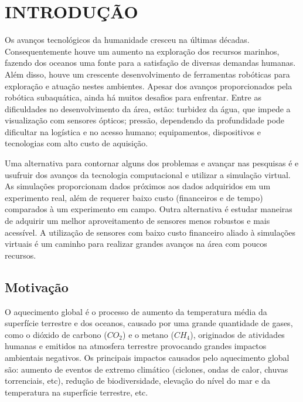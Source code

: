 
\chapter{INTRODUÇÃO}
\label{chap:introducao}

Os avanços tecnológicos da humanidade cresceu na últimas décadas. 
Consequentemente houve um aumento na exploração dos recursos marinhos, fazendo dos oceanos uma fonte para a satisfação de diversas demandas humanas.
Além disso, houve um crescente desenvolvimento de ferramentas robóticas para exploração e atuação nestes ambientes.
Apesar dos avanços proporcionados pela robótica subaquática, ainda há muitos desafios para enfrentar. 
Entre as dificuldades no desenvolvimento da área, estão: turbidez da água, que impede a visualização com sensores ópticos; pressão, dependendo da profundidade pode dificultar na logística e no acesso humano; equipamentos, dispositivos e tecnologias com alto custo de aquisição. 

Uma alternativa para contornar alguns dos problemas e avançar nas pesquisas é e usufruir dos avanços da tecnologia computacional e utilizar a simulação virtual.
As simulações proporcionam dados próximos aos dados adquiridos em um experimento real, além de requerer baixo custo (financeiros e de tempo) comparados à um experimento em campo. 
Outra alternativa é estudar maneiras de adquirir um melhor aproveitamento de sensores menos robustos e mais acessível.
A utilização de sensores com baixo custo financeiro aliado à simulações virtuais é um caminho para realizar grandes avanços na área com poucos recursos.

\section{Motivação}
\label{sec:motivacao}

O aquecimento global é o processo de aumento da temperatura média da superfície terrestre e dos oceanos, causado por uma grande quantidade de gases, como o dióxido de carbono ($CO_2$) e o metano ($CH_4$), originados de atividades humanas e emitidos na atmosfera terrestre provocando grandes impactos ambientais negativos. Os principais impactos causados pelo aquecimento global são: aumento de eventos de extremo climático (ciclones, ondas de calor, chuvas torrenciais, etc), redução de biodiversidade, elevação do nível do mar e da temperatura na superfície terrestre, etc. 


